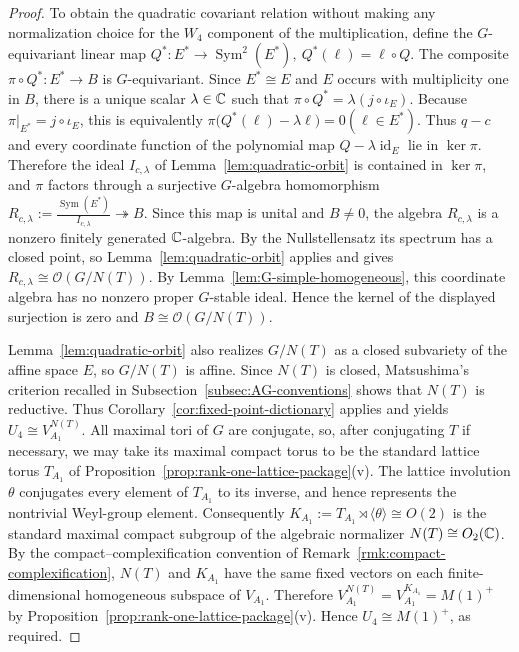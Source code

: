 \documentclass[10pt,a4paper]{amsart}
\numberwithin{equation}{section} \newtheorem{thm}{Theorem}[section] \newtheorem{lem}[thm]{Lemma} \newtheorem{ex}[thm]{Example} \newtheorem{prop}[thm]{Proposition} \newtheorem{cor}[thm]{Corollary} \newtheorem{defi}[thm]{Definition} \newtheorem{rmk}[thm]{Remark} \newtheorem{notation}[thm]{Notation}
\newcommand{\id}{\operatorname{id}}
\newcommand{\Sym}{\operatorname{Sym}}
\newcommand{\OO}{\mathcal O}
\begin{document}
\begin{proof}
To obtain the quadratic covariant relation without making any normalization choice for the $W_4$ component of the multiplication, define the $G$-equivariant linear map \(Q^*:E^*\longrightarrow\Sym^2(E^*),\ Q^*(\ell)=\ell\circ Q.\) The composite $\pi\circ Q^*:E^*\to B$ is $G$-equivariant. Since $E^*\cong E$ and $E$ occurs with multiplicity one in $B$, there is a unique scalar $\lambda\in\mathbb{C}$ such that \(\pi\circ Q^*=\lambda(j\circ\iota_E).\) Because $\pi|_{E^*}=j\circ\iota_E$, this is equivalently \(\pi\bigl(Q^*(\ell)-\lambda\ell\bigr)=0(\ell\in E^*).\) Thus $q-c$ and every coordinate function of the polynomial map $Q-\lambda\id_E$ lie in $\ker\pi$. Therefore the ideal $I_{c,\lambda}$ of Lemma~\ref{lem:quadratic-orbit} is contained in $\ker\pi$, and $\pi$ factors through a surjective $G$-algebra homomorphism \(R_{c,\lambda}:=\frac{\Sym(E^*)}{I_{c,\lambda}}\twoheadrightarrow B.\) Since this map is unital and $B\ne0$, the algebra $R_{c,\lambda}$ is a nonzero finitely generated $\mathbb{C}$-algebra. By the Nullstellensatz its spectrum has a closed point, so Lemma~\ref{lem:quadratic-orbit} applies and gives \(R_{c,\lambda}\cong\OO(G/N(T)).\) By Lemma~\ref{lem:G-simple-homogeneous}, this coordinate algebra has no nonzero proper $G$-stable ideal. Hence the kernel of the displayed surjection is zero and \(B\cong\OO(G/N(T)).\)

Lemma~\ref{lem:quadratic-orbit} also realizes $G/N(T)$ as a closed subvariety of the affine space $E$, so $G/N(T)$ is affine. Since $N(T)$ is closed, Matsushima's criterion recalled in Subsection~\ref{subsec:AG-conventions} shows that $N(T)$ is reductive. Thus Corollary~\ref{cor:fixed-point-dictionary} applies and yields \(U_4\cong V_{A_1}^{N(T)}.\) All maximal tori of $G$ are conjugate, so, after conjugating $T$ if necessary, we may take its maximal compact torus to be the standard lattice torus $T_{A_1}$ of Proposition~\ref{prop:rank-one-lattice-package}(v). The lattice involution $\theta$ conjugates every element of $T_{A_1}$ to its inverse, and hence represents the nontrivial Weyl-group element. Consequently \(K_{A_1}:=T_{A_1}\rtimes\langle\theta\rangle\cong O(2)\) is the standard maximal compact subgroup of the algebraic normalizer $N(T)\cong O_2(\mathbb{C})$. By the compact--complexification convention of Remark~\ref{rmk:compact-complexification}, $N(T)$ and $K_{A_1}$ have the same fixed vectors on each finite-dimensional homogeneous subspace of $V_{A_1}$. Therefore \(V_{A_1}^{N(T)}=V_{A_1}^{K_{A_1}}=M(1)^+\) by Proposition~\ref{prop:rank-one-lattice-package}(v). Hence \(U_4\cong M(1)^+\), as required.
\end{proof}
\end{document}
